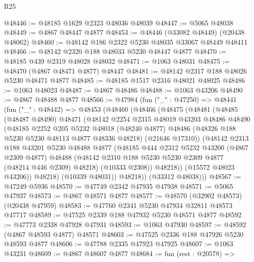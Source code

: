 \begin{lexlean}{R25}
\begin{coremodule}
@48446 := @48185 @1629 @2323 @48036 @48039
@48447 := @5065 @48038
@48449 := @4867 @48447 @4877
@48453 := @48446 (@33082 @48449) (@20438 @48062)
@48460 := @48142 @186 @2322 @5230 @48035 @33067 @48449 @48411
@48466 := @48142 @2320 @188 @48033 @5230 @48447 @4877
@48470 := @48185 @439 @2319 @48028 @48032
@48471 := @1063 @48031
@48475 := @48470 (@4867 @48471 @4877) @48447
@48481 := @48142 @2317 @188 @48026 @5230 @48471 @4877
@48485 := @48185 @1517 @2316 @48021 @48025
@48486 := @1063 @48023
@48487 := @4867 @48486
@48488 := @1063 @43206
@48490 := @4867 @48488 @4877
@48566 := @47984
    (fun ("_" : @47250) =>
    @48441
      (fun ("_" : @48442) =>
      @48453
        (@48460
          (@48466
            (@48475
              (@48481
                (@48485
                  (@48487 @48490)
                  @48471
                  (@48142
                    @2254
                    @2315
                    @48019
                    @43203
                    @48486
                    @48490
                    (@48185
                      @2252
                      @205
                      @5232
                      @48018
                      (@48240 @4877)
                      @48486
                      (@48326 @188 @5230 @5230 @48113 @4877 @48336 @48218)
                      (@21646 @17310))
                    (@48142
                      @2313
                      @188
                      @43201
                      @5230
                      @48488
                      @4877
                      (@48185
                        @444
                        @2312
                        @5232
                        @43200
                        (@4867 @2309 @4877)
                        @48488
                        (@48142 @2310 @188 @5230 @5230 @2309 @4877 (@48214 @446 @2309) @48218)
                        (@10333 @2308))
                      @48218))
                  (@15572 @48023 @43206))
                @48218)
              (@10339 @48031))
            @48218))
        (@33312 @48038)))
@48567 := @47249 @5936
@48570 := @47749 @2342 @47935 @47938
@48571 := @5065 @47937
@48573 := @4867 @48571 @4877
@48577 := @48570 (@32902 @48573) (@20438 @47959)
@48583 := @47760 @2341 @5230 @47934 @32811 @48573 @47717
@48589 := @47525 @2339 @188 @47932 @5230 @48571 @4877
@48592 := @47773 @2338 @47928 @47931
@48593 := @1063 @47930
@48597 := @48592 (@4867 @48593 @4877) @48571
@48603 := @47525 @2336 @188 @47926 @5230 @48593 @4877
@48606 := @47788 @2335 @47923 @47925
@48607 := @1063 @43231
@48609 := @4867 @48607 @4877
@48684 := fun (rest : @20578) =>

\end{coremodule}
\end{lexlean}
